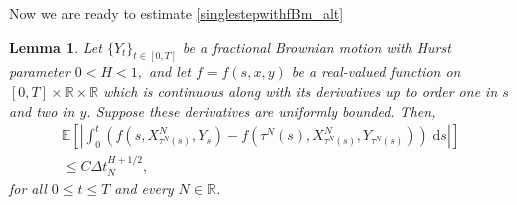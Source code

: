 \documentclass[reqno,12pt]{amsart}
\theoremstyle{plain}%
\newtheorem{lem}{Lemma}[section]
\theoremstyle{definition}
\begin{document}
Now we are ready to estimate \eqref{singlestepwithfBm_alt}
\begin{lem}
    \label{lemfBmsteps}
    Let $\{Y_t\}_{t\in [0, T]}$ be a fractional Brownian motion with Hurst parameter $0 < H < 1,$ and let $f=f(s, x, y)$ be a real-valued function on $[0, T]\times\mathbb{R}\times \mathbb{R}$ which is continuous along with its derivatives up to order one in $s$ and two in $y$. Suppose these derivatives are uniformly bounded. Then,
    \begin{multline}
        \label{expectintfboundbyfBm}
        \mathbb{E}\left[\left|\int_0^t \left(f(s, X_{\tau^N(s)}^N, Y_s) - f(\tau^N(s), X_{\tau^N(s)}^N, Y_{\tau^N(s)})\right)\;\mathrm{d}s\right|\right]  \\
        \leq C\Delta t_N^{H+1/2},
    \end{multline}
    for all $0 \leq t \leq T$ and every $N\in \mathbb{R}$.
\end{lem}
\end{document}
